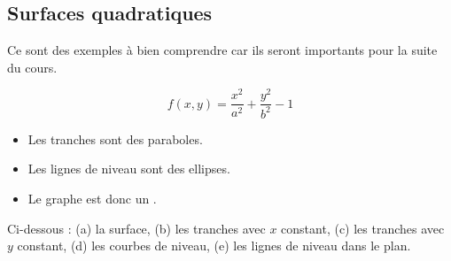 \subsection{Surfaces quadratiques}

Ce sont des exemples à bien comprendre car ils seront importants pour la suite du cours.

\begin{exemple}{}{}
	$$f(x,y) = \frac{x^2}{a^2} + \frac{y^2}{b^2}-1$$
	
	
	
	\begin{itemize}
		\item Les tranches sont des paraboles.
		\item Les lignes de niveau sont des ellipses.
		\item Le graphe est donc un .
	\end{itemize}
	
	Ci-dessous : (a) la surface, (b) les tranches avec $x$ constant, (c) les tranches avec $y$ constant, (d) les courbes de niveau, (e) les lignes de niveau dans le plan.
	

\end{exemple}
